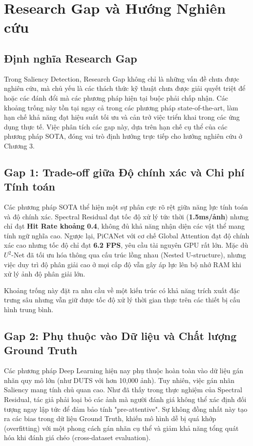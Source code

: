 \section{Research Gap và Hướng Nghiên cứu}

\subsection{Định nghĩa Research Gap}

Trong Saliency Detection, Research Gap không chỉ là những vấn đề chưa được nghiên cứu, mà chủ yếu là các thách thức kỹ thuật chưa được giải quyết triệt để hoặc các đánh đổi mà các phương pháp hiện tại buộc phải chấp nhận. Các khoảng trống này tồn tại ngay cả trong các phương pháp state-of-the-art, làm hạn chế khả năng đạt hiệu suất tối ưu và cản trở việc triển khai trong các ứng dụng thực tế. Việc phân tích các gap này, dựa trên hạn chế cụ thể của các phương pháp SOTA, đóng vai trò định hướng trực tiếp cho hướng nghiên cứu ở Chương 3.

\subsection{Gap 1: Trade-off giữa Độ chính xác và Chi phí Tính toán}

Các phương pháp SOTA thể hiện một sự phân cực rõ rệt giữa năng lực tính toán và độ chính xác. Spectral Residual \cite{sr_2007} đạt tốc độ xử lý tức thời (\textbf{1.5ms/ảnh}) nhưng chỉ đạt \textbf{Hit Rate khoảng 0.4}, không đủ khả năng nhận diện các vật thể mang tính ngữ nghĩa cao. Ngược lại, PiCANet \cite{picanet_2018} với cơ chế Global Attention đạt độ chính xác cao nhưng tốc độ chỉ đạt \textbf{6.2 FPS}, yêu cầu tài nguyên GPU rất lớn. Mặc dù $U^2$-Net \cite{u2net_2020} đã tối ưu hóa thông qua cấu trúc lồng nhau (Nested U-structure), nhưng việc duy trì độ phân giải cao ở mọi cấp độ vẫn gây áp lực lên bộ nhớ RAM khi xử lý ảnh độ phân giải lớn.

Khoảng trống này đặt ra nhu cầu về một kiến trúc có khả năng trích xuất đặc trưng sâu nhưng vẫn giữ được tốc độ xử lý thời gian thực trên các thiết bị cấu hình trung bình.

\subsection{Gap 2: Phụ thuộc vào Dữ liệu và Chất lượng Ground Truth}
Các phương pháp Deep Learning hiện nay phụ thuộc hoàn toàn vào dữ liệu gán nhãn quy mô lớn (như DUTS với hơn 10,000 ảnh). Tuy nhiên, việc gán nhãn Saliency mang tính chủ quan cao. Như đã thấy trong thực nghiệm của Spectral Residual, tác giả phải loại bỏ các ảnh mà người đánh giá không thể xác định đối tượng ngay lập tức để đảm bảo tính "pre-attentive". Sự không đồng nhất này tạo ra các bias trong dữ liệu Ground Truth, khiến mô hình dễ bị quá khớp (overfitting) với một phong cách gán nhãn cụ thể và giảm khả năng tổng quát hóa khi đánh giá chéo (cross-dataset evaluation). 

